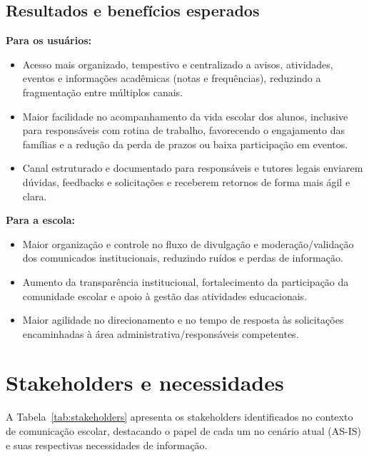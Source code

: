 \documentclass[a4paper,12pt]{report}
\begin{document}
\subsection{Resultados e benefícios esperados}

\textbf{Para os usuários:}
\begin{itemize}
    \item Acesso mais organizado, tempestivo e centralizado a avisos, atividades, eventos e informações acadêmicas (notas e frequências), reduzindo a fragmentação entre múltiplos canais.
    \item Maior facilidade no acompanhamento da vida escolar dos alunos, inclusive para responsáveis com rotina de trabalho, favorecendo o engajamento das famílias e a redução da perda de prazos ou baixa participação em eventos.
    \item Canal estruturado e documentado para responsáveis e tutores legais enviarem dúvidas, feedbacks e solicitações e receberem retornos de forma mais ágil e clara.
\end{itemize}

\textbf{Para a escola:}
\begin{itemize}
    \item Maior organização e controle no fluxo de divulgação e moderação/validação dos comunicados institucionais, reduzindo ruídos e perdas de informação.
    \item Aumento da transparência institucional, fortalecimento da participação da comunidade escolar e apoio à gestão das atividades educacionais.
    \item Maior agilidade no direcionamento e no tempo de resposta às solicitações encaminhadas à área administrativa/responsáveis competentes.
\end{itemize}

\section{Stakeholders e necessidades}

A Tabela~\ref{tab:stakeholders} apresenta os stakeholders identificados no contexto de comunicação escolar, destacando o papel de cada um no cenário atual (AS-IS) e suas respectivas necessidades de informação.
\end{document}
